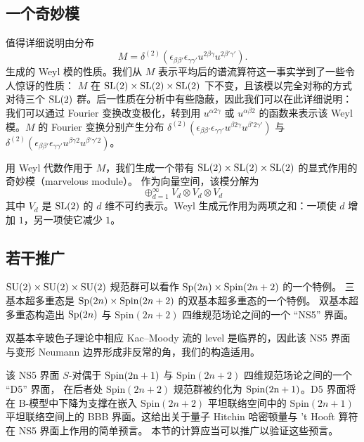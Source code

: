 \subsection{一个奇妙模}\label{marvel}
值得详细说明由分布
\begin{equation}
M=\delta^{(2)}(\epsilon_{\beta \beta'}\epsilon_{\gamma \gamma'} u^{2\beta \gamma} u^{2 \beta' \gamma'}).
\end{equation}
生成的 Weyl 模的性质。我们从 $M$ 表示平均后的谱流算符这一事实学到了一些令人惊讶的性质：
$M$ 在 ${\mathrm{SL}}(2) \times {\mathrm{SL}}(2) \times {\mathrm{SL}}(2)$ 下不变，且该模以完全对称的方式对待三个 ${\mathrm{SL}}(2)$ 群。后一性质在分析中有些隐蔽，因此我们可以在此详细说明：我们可以通过 Fourier 变换改变极化，转到用 $u^{\alpha 2 \gamma}$ 或 $u^{\alpha \beta 2}$ 的函数来表示该 Weyl 模。$M$ 的 Fourier 变换分别产生分布 $\delta^{(2)}(\epsilon_{\beta \beta'}\epsilon_{\gamma \gamma'} u^{\beta 2 \gamma} u^{\beta' 2\gamma'})$ 与 $\delta^{(2)}(\epsilon_{\beta \beta'}\epsilon_{\gamma \gamma'} u^{\beta \gamma 2} u^{\beta' \gamma' 2})$。 

用 Weyl 代数作用于 $M$，我们生成一个带有 ${\mathrm{SL}}(2) \times {\mathrm{SL}}(2) \times {\mathrm{SL}}(2)$ 的显式作用的奇妙模（marvelous module）。
作为向量空间，该模分解为
\begin{equation}\label{marmod}
\oplus_{d=1}^\infty V_d\otimes V_d \otimes V_d
\end{equation}
其中 $V_d$ 是 ${\mathrm{SL}}(2)$ 的 $d$ 维不可约表示。Weyl 生成元作用为两项之和：一项使 $d$ 增加 $1$，另一项使它减少 $1$。

\subsection{若干推广}
${\mathrm{SU}}(2) \times {\mathrm{SU}}(2) \times {\mathrm{SU}}(2)$ 规范群可以看作 ${\mathrm{Sp}}(2n) \times \mathrm{Spin}(2n+2)$ 的一个特例。 
三基本超多重态是 ${\mathrm{Sp}}(2n) \times \mathrm{Spin}(2n+2)$ 的双基本超多重态的一个特例。
双基本超多重态构造出 ${\mathrm{Sp}}(2n)$ 与 $\mathrm{Spin}(2n+2)$ 四维规范场论之间的一个 “NS5” 界面。 

双基本辛玻色子理论中相应 Kac–Moody 流的 level 是临界的，因此该 NS5 界面
与变形 Neumann 边界形成非反常的角，我们的构造适用。 

该 NS5 界面 $S$-对偶于 $\mathrm{{\mathrm{Spin}}(2n+1)}$ 与 $\mathrm{Spin}(2n+2)$ 四维规范场论之间的一个 “D5” 界面，
在后者处 $\mathrm{Spin}(2n+2)$ 规范群被约化为 $\mathrm{{\mathrm{Spin}}(2n+1)}$。D5 界面将在 B-模型中下降为支撑在嵌入 $\mathrm{Spin}(2n+2)$ 平坦联络空间中的 $\mathrm{Spin}(2n+1)$ 平坦联络空间上的 BBB 界面。这给出关于量子 Hitchin 哈密顿量与 't Hooft 算符在 NS5 界面上作用的简单预言。 
本节的计算应当可以推广以验证这些预言。 

